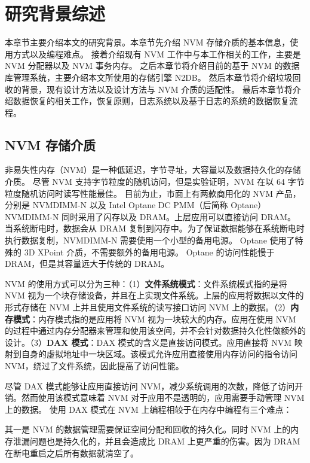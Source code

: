 
\chapter{研究背景综述}

本章节主要介绍本文的研究背景。本章节先介绍 NVM 存储介质的基本信息，使用方式以及编程难点。
接着介绍现有 NVM 工作中与本工作相关的工作，主要是 NVM 分配器以及 NVM 事务内存。
之后本章节将介绍目前的基于 NVM 的数据库管理系统，主要介绍本文所使用的存储引擎 N2DB。
然后本章节将介绍垃圾回收的背景，现有设计方法以及设计方法与 NVM 介质的适配性。
最后本章节将介绍数据恢复的相关工作，恢复原则，日志系统以及基于日志的系统的数据恢复流程。

\section{NVM 存储介质}

非易失性内存（NVM）是一种低延迟，字节寻址，大容量以及数据持久化的存储介质。
尽管 NVM 支持字节粒度的随机访问，但是实验证明，NVM 在以 64 字节粒度随机访问时读写性能最佳。
目前为止，市面上有两款商用化的 NVM 产品，分别是 NVMDIMM-N 以及 Intel Optane DC PMM（后简称 Optane）
NVMDIMM-N 同时采用了闪存以及 DRAM。上层应用可以直接访问 DRAM。
当系统断电时，数据会从 DRAM 复制到闪存中。为了保证数据能够在系统断电时执行数据复制，NVMDIMM-N 需要使用一个小型的备用电源。
Optane 使用了特殊的 3D XPoint 介质，不需要额外的备用电源。
Optane 的访问性能慢于 DRAM，但是其容量远大于传统的 DRAM。


NVM 的使用方式可以分为三种：（1）\textbf{文件系统模式}：文件系统模式指的是将 NVM 视为一个块存储设备，并且在上实现文件系统。上层的应用将数据以文件的形式存储在 NVM 上并且使用文件系统的读写接口访问 NVM 上的数据。（2）\textbf{内存模式}：内存模式指的是应用将 NVM 视为一块较大的内存。应用在使用 NVM 的过程中通过内存分配器来管理和使用该空间，并不会针对数据持久化性做额外的设计。（3）\textbf{DAX 模式}：DAX 模式的含义是直接访问模式。应用直接将 NVM 映射到自身的虚拟地址中一块区域。该模式允许应用直接使用内存访问的指令访问 NVM，绕过了文件系统，因此提高了访问性能。

尽管 DAX 模式能够让应用直接访问 NVM，减少系统调用的次数，降低了访问开销。然而使用该模式意味着 NVM 对于应用不是透明的，应用需要手动管理 NVM 上的数据。
使用 DAX 模式在 NVM 上编程相较于在内存中编程有三个难点：

其一是 NVM 的数据管理需要保证空间分配和回收的持久化。同时 NVM 上的内存泄漏问题也是持久化的，并且会造成比 DRAM 上更严重的伤害。因为 DRAM 在断电重启之后所有数据就清空了。

